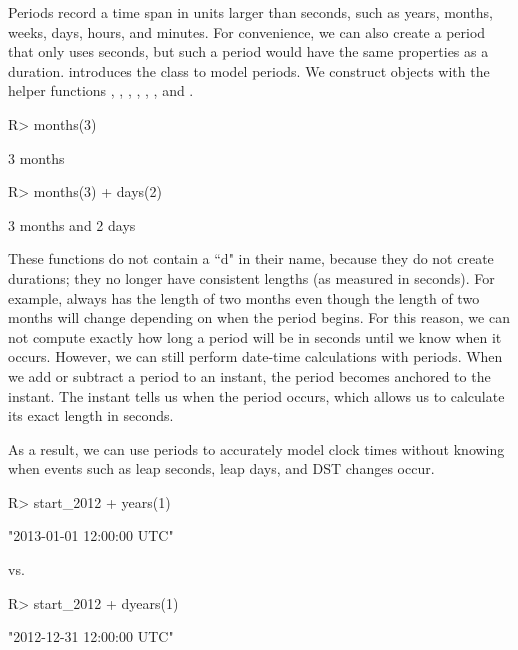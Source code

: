 \documentclass[article]{jss}
\begin{document}
Periods record a time span in units larger than seconds, such as years, months, weeks, days, hours, and minutes. For convenience, we can also create a period that only uses seconds, but such a period would have the same properties as a duration.  introduces the  class to model periods. We construct  objects with the helper functions , , , , , , and  .

\begin{CodeInput}
R> months(3)
\end{CodeInput}
\begin{CodeOutput}
[1] 3 months
\end{CodeOutput}

\begin{CodeInput}
R> months(3) + days(2)
\end{CodeInput}
\begin{CodeOutput}
[1] 3 months and 2 days
\end{CodeOutput}

These functions do not contain a ``d" in their name, because they do not create durations; they no longer have consistent lengths (as measured in seconds). For example,  always has the length of two months even though the length of two months will change depending on when the period begins. For this reason, we can not compute exactly how long a period will be in seconds until we know when it occurs. However, we can still perform date-time calculations with periods. When we add or subtract a period to an instant, the period becomes anchored to the instant. The instant tells us when the period occurs, which allows us to calculate its exact length in seconds.

As a result, we can use periods to accurately model clock times without knowing when events such as leap seconds, leap days, and DST changes occur.

\begin{CodeInput}
R> start_2012 + years(1)
\end{CodeInput}
\begin{CodeOutput}
[1] "2013-01-01 12:00:00 UTC"
\end{CodeOutput}

vs.

\begin{CodeInput}
R> start_2012 + dyears(1)
\end{CodeInput}
\begin{CodeOutput}
[1] "2012-12-31 12:00:00 UTC"
\end{CodeOutput}
\end{document}
